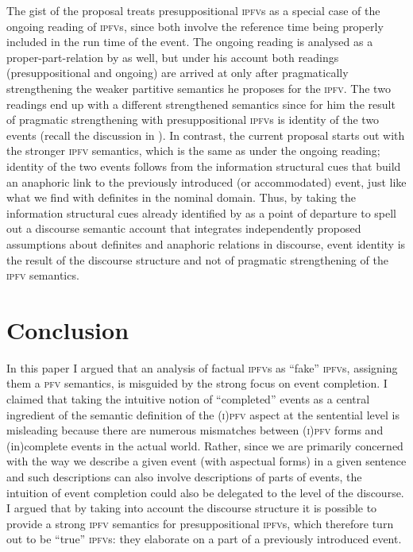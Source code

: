 \documentclass[output=paper]{langscibook}
\begin{document}
The gist of the proposal treats presuppositional \textsc{ipfv}s as a special case of the ongoing reading of \textsc{ipfv}s, since both involve the reference time being properly included in the run time of the event. The ongoing reading is analysed as a proper-part-relation by \citet{altshuler14} as well, but under his account both readings (presuppositional and ongoing) are arrived at only after pragmatically strengthening the weaker partitive semantics he proposes for the \textsc{ipfv}. The two readings end up with a different strengthened semantics since for him the result of pragmatic strengthening with presuppositional \textsc{ipfv}s is identity of the two events (recall the discussion in ). In contrast, the current proposal starts out with the stronger \textsc{ipfv} semantics, which is the same as under the ongoing rea\-ding; identity of the two events follows from the information structural cues that build an anaphoric link to the previously introduced (or accommodated) event, just like what we find with definites in the nominal domain. Thus, by taking the information structural cues already identified by \citet{gronndiss} as a point of departure to spell out a discourse semantic account that integrates independently proposed assumptions about definites and anaphoric relations in discourse, event identity is the result of the discourse structure and not of pragmatic strengthening of the \textsc{ipfv} semantics.  

\section{Conclusion}
\label{gehr:sec:concl}

In this paper I argued that an analysis of factual \textsc{ipfv}s as ``fake'' \textsc{ipfv}s, assigning them a \textsc{pfv} semantics, is misguided by the strong focus on event completion. I claimed that taking the intuitive notion of ``completed'' events as a central ingredient of the semantic definition of the \textsc{(i)pfv} aspect at the sentential level is misleading because there are numerous mismatches between \textsc{(i)pfv} forms and (in)complete events in the actual world. Rather, since we are primarily concerned with the way we describe a given event (with aspectual forms) in a given sentence and such descriptions can also involve descriptions of parts of events, the intuition of event completion could also be delegated to the level of the discourse. I argued that by taking into account the discourse structure it is possible to provide a strong \textsc{ipfv} semantics for presuppositional \textsc{ipfv}s, which therefore turn out to be ``true'' \textsc{ipfv}s: they elaborate on a part of a previously introduced event.
\end{document}
